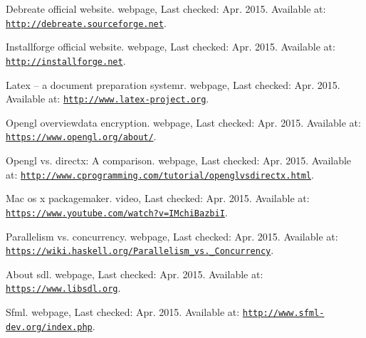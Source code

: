 
\begin{DoxyDescription}
\item[\label{_CITEREF_debreate}%
\mbox{[}1\mbox{]}]Debreate official website. webpage, Last checked\+: Apr. 2015. Available at\+: \href{http://debreate.sourceforge.net}{\tt http\+://debreate.\+sourceforge.\+net}.


\item[\label{_CITEREF_installforge}%
\mbox{[}2\mbox{]}]Installforge official website. webpage, Last checked\+: Apr. 2015. Available at\+: \href{http://installforge.net}{\tt http\+://installforge.\+net}.


\item[\label{_CITEREF_latex}%
\mbox{[}3\mbox{]}]Latex -- a document preparation systemr. webpage, Last checked\+: Apr. 2015. Available at\+: \href{http://www.latex-project.org}{\tt http\+://www.\+latex-\/project.\+org}.


\item[\label{_CITEREF_opengl}%
\mbox{[}4\mbox{]}]Opengl overviewdata encryption. webpage, Last checked\+: Apr. 2015. Available at\+: \href{https://www.opengl.org/about/}{\tt https\+://www.\+opengl.\+org/about/}.


\item[\label{_CITEREF_openglvsd3x}%
\mbox{[}5\mbox{]}]Opengl vs. directx\+: A comparison. webpage, Last checked\+: Apr. 2015. Available at\+: \href{http://www.cprogramming.com/tutorial/openglvsdirectx.html}{\tt http\+://www.\+cprogramming.\+com/tutorial/openglvsdirectx.\+html}.


\item[\label{_CITEREF_PackageMaker}%
\mbox{[}6\mbox{]}]Mac os x packagemaker. video, Last checked\+: Apr. 2015. Available at\+: \href{https://www.youtube.com/watch?v=IMchiBazbiI}{\tt https\+://www.\+youtube.\+com/watch?v=\+I\+Mchi\+Bazbi\+I}.


\item[\label{_CITEREF_parallelismVsConcurrency}%
\mbox{[}7\mbox{]}]Parallelism vs. concurrency. webpage, Last checked\+: Apr. 2015. Available at\+: \href{https://wiki.haskell.org/Parallelism_vs._Concurrency}{\tt https\+://wiki.\+haskell.\+org/\+Parallelism\+\_\+vs.\+\_\+\+Concurrency}.


\item[\label{_CITEREF_sdl}%
\mbox{[}8\mbox{]}]About sdl. webpage, Last checked\+: Apr. 2015. Available at\+: \href{https://www.libsdl.org}{\tt https\+://www.\+libsdl.\+org}.


\item[\label{_CITEREF_sfml}%
\mbox{[}9\mbox{]}]Sfml. webpage, Last checked\+: Apr. 2015. Available at\+: \href{http://www.sfml-dev.org/index.php}{\tt http\+://www.\+sfml-\/dev.\+org/index.\+php}.


\end{DoxyDescription}